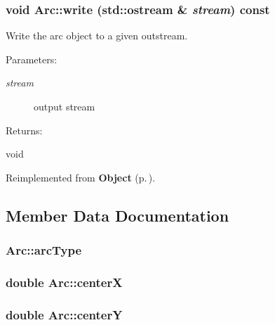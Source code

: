\subsubsection{\setlength{\rightskip}{0pt plus 5cm}void Arc::write (std::ostream \& {\em stream}) const\hspace{0.3cm}{\tt  [virtual]}}\label{classArc_a6}


Write the arc object to a given outstream. \begin{Desc}
\item[Parameters: ]\par
\begin{description}
\item[{\em 
stream}]output stream \end{description}
\end{Desc}
\begin{Desc}
\item[Returns: ]\par
void \end{Desc}


Reimplemented from {\bf Object} {\rm (p.\,\pageref{classObject_a3})}.

\subsection{Member Data Documentation}
\subsubsection{ Arc::arc\-Type\hspace{0.3cm}{\tt  [protected]}}\label{classArc_n0}


\subsubsection{\setlength{\rightskip}{0pt plus 5cm}double Arc::center\-X\hspace{0.3cm}{\tt  [protected]}}\label{classArc_n2}


\subsubsection{\setlength{\rightskip}{0pt plus 5cm}double Arc::center\-Y\hspace{0.3cm}{\tt  [protected]}}\label{classArc_n3}


